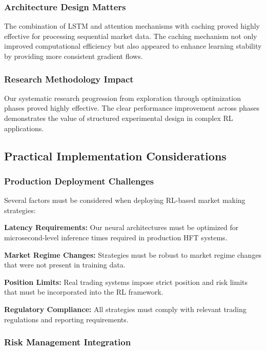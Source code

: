 \documentclass[conference]{IEEEtran}
\begin{document}
\subsubsection{Architecture Design Matters}

The combination of LSTM and attention mechanisms with caching proved highly effective for processing sequential market data. The caching mechanism not only improved computational efficiency but also appeared to enhance learning stability by providing more consistent gradient flows.

\subsubsection{Research Methodology Impact}

Our systematic research progression from exploration through optimization phases proved highly effective. The clear performance improvement across phases demonstrates the value of structured experimental design in complex RL applications.

\subsection{Practical Implementation Considerations}

\subsubsection{Production Deployment Challenges}

Several factors must be considered when deploying RL-based market making strategies:

\textbf{Latency Requirements:} Our neural architectures must be optimized for microsecond-level inference times required in production HFT systems.

\textbf{Market Regime Changes:} Strategies must be robust to market regime changes that were not present in training data.

\textbf{Position Limits:} Real trading systems impose strict position and risk limits that must be incorporated into the RL framework.

\textbf{Regulatory Compliance:} All strategies must comply with relevant trading regulations and reporting requirements.

\subsubsection{Risk Management Integration}
\end{document}
